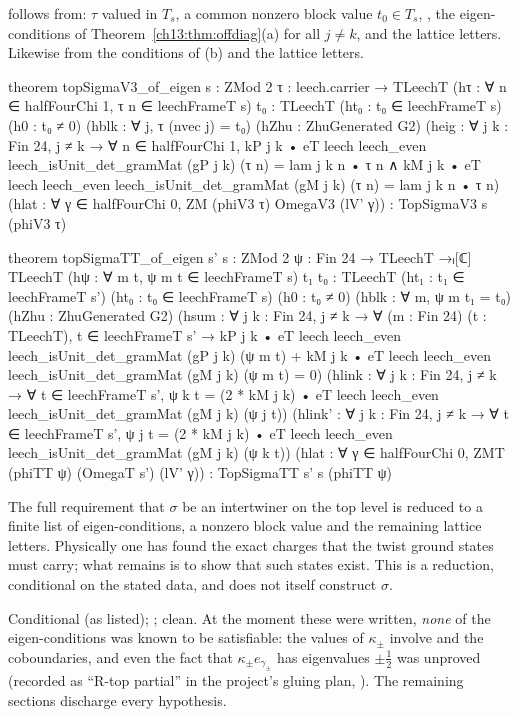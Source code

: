 \begin{theorem}\label{ch13:thm:of-eigen}
 follows from: $\tau$ valued in $T_s$, a common nonzero block value $t_0\in T_s$,
, the eigen-conditions of Theorem~\ref{ch13:thm:offdiag}(a) for all $j\ne k$, and the
lattice letters. Likewise  from the conditions of (b) and the lattice letters.
\end{theorem}
\begin{leancode}
theorem topSigmaV3_of_eigen {s : ZMod 2} {τ : leech.carrier → TLeechT}
    (hτ : ∀ n ∈ halfFourChi 1, τ n ∈ leechFrameT s) {t₀ : TLeechT} (ht₀ : t₀ ∈ leechFrameT s)
    (h0 : t₀ ≠ 0) (hblk : ∀ j, τ (nvec j) = t₀) (hZhu : ZhuGenerated G2)
    (heig : ∀ j k : Fin 24, j ≠ k → ∀ n ∈ halfFourChi 1,
      kP j k • eT leech leech_even leech_isUnit_det_gramMat (gP j k) (τ n) = lam j k n • τ n ∧
      kM j k • eT leech leech_even leech_isUnit_det_gramMat (gM j k) (τ n) = lam j k n • τ n)
    (hlat : ∀ γ ∈ halfFourChi 0, ZM (phiV3 τ) OmegaV3 (lV' γ)) :
    TopSigmaV3 s (phiV3 τ)

theorem topSigmaTT_of_eigen {s' s : ZMod 2} {ψ : Fin 24 → TLeechT →ₗ[ℂ] TLeechT}
    (hψ : ∀ m t, ψ m t ∈ leechFrameT s) {t₁ t₀ : TLeechT} (ht₁ : t₁ ∈ leechFrameT s')
    (ht₀ : t₀ ∈ leechFrameT s) (h0 : t₀ ≠ 0) (hblk : ∀ m, ψ m t₁ = t₀) (hZhu : ZhuGenerated G2)
    (hsum : ∀ j k : Fin 24, j ≠ k → ∀ (m : Fin 24) (t : TLeechT), t ∈ leechFrameT s' →
      kP j k • eT leech leech_even leech_isUnit_det_gramMat (gP j k) (ψ m t)
        + kM j k • eT leech leech_even leech_isUnit_det_gramMat (gM j k) (ψ m t) = 0)
    (hlink : ∀ j k : Fin 24, j ≠ k → ∀ t ∈ leechFrameT s',
      ψ k t = (2 * kM j k) • eT leech leech_even leech_isUnit_det_gramMat (gM j k) (ψ j t))
    (hlink' : ∀ j k : Fin 24, j ≠ k → ∀ t ∈ leechFrameT s',
      ψ j t = (2 * kM j k) • eT leech leech_even leech_isUnit_det_gramMat (gM j k) (ψ k t))
    (hlat : ∀ γ ∈ halfFourChi 0, ZMT (phiTT ψ) (OmegaT s') (lV' γ)) :
    TopSigmaTT s' s (phiTT ψ)
\end{leancode}
\begin{physics}
The full requirement that $\sigma$ be an intertwiner on the top level is reduced to a finite list of eigen-conditions, a nonzero block value and the remaining lattice letters. Physically one has found the exact charges that the twist ground states must carry; what remains is to show that such states exist. This is a reduction, conditional on the stated data, and does not itself construct $\sigma$.
\end{physics}
\begin{status}
Conditional (as listed); ;  clean. At the moment
these were written, \emph{none} of the eigen-conditions was known to be satisfiable: the values of
$\kappa_\pm$ involve  and the coboundaries, and even the fact that $\kappa_\pm e_{\gamma_\pm}$ has
eigenvalues $\pm\tfrac12$ was unproved (recorded as ``R-top partial'' in the project's gluing plan, ). The remaining sections
discharge every hypothesis.
\end{status}

